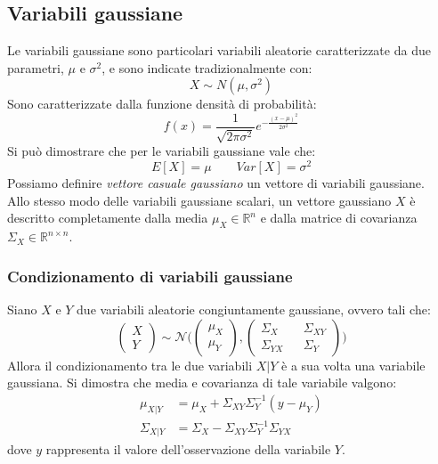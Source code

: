 \subsection{Variabili gaussiane}

Le variabili gaussiane sono particolari variabili aleatorie caratterizzate da due parametri, $\mu$ e $\sigma^2$, e sono indicate tradizionalmente con: 
\begin{equation}
X \sim N(\mu ,\sigma^2)
\end{equation}
Sono caratterizzate dalla funzione densità di probabilità: 
\begin{equation}
f(x) = \frac{1}{\sqrt {2\pi\sigma^2}}e^{-\frac{(x-\mu)^2}{2\sigma^2}}
\end{equation}
Si può dimostrare che per le variabili gaussiane vale che: 
\begin{equation}
E[X]= \mu \qquad Var[X]= \sigma^2
\end{equation}
Possiamo definire \textit{vettore casuale gaussiano} un vettore di variabili gaussiane.\\
Allo stesso modo delle variabili gaussiane scalari, un vettore gaussiano $X$ è descritto completamente dalla media $\mu_X \in \mathbb{R}^n$ e dalla matrice di covarianza $\Sigma_X \in \mathbb{R}^{n \times n}$.\\

\subsubsection{Condizionamento di variabili gaussiane}
Siano $X$ e $Y$ due variabili aleatorie congiuntamente gaussiane, ovvero tali che:
\begin{equation}
\label{congiuntgauss}
\begin{pmatrix}X \\ Y\end{pmatrix} \sim \mathcal{N} \Biggl ( \begin{pmatrix}\mu_X \\ \mu_Y\end{pmatrix}, \begin{pmatrix}\Sigma_X && \Sigma_{XY} \\ \Sigma_{YX} && \Sigma_Y\end{pmatrix} \Biggl )
\end{equation}
Allora il condizionamento tra le due variabili $X|Y$ è a sua volta una variabile gaussiana.
Si dimostra\cite{stimablue} che media e covarianza di tale variabile valgono:
\begin{align}
\mu_{X|Y}&=\mu_X + \Sigma_{XY}\Sigma_{Y}^{-1}(y-\mu_Y)\\
\Sigma_{X|Y}&=\Sigma_X-\Sigma_{XY}\Sigma_{Y}^{-1}\Sigma_{YX}
\end{align}
dove $y$ rappresenta il valore dell'osservazione della variabile $Y$.

\newpage